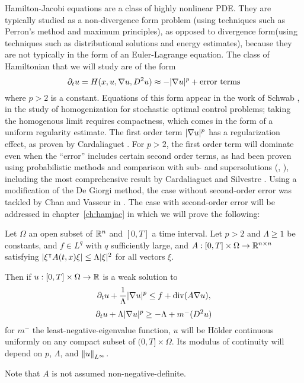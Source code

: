 Hamilton-Jacobi equations are a class of highly nonlinear PDE.  They are typically studied as a non-divergence form problem (using techniques such as Perron's method and maximum principles), as opposed to divergence form(using techniques such as distributional solutions and energy estimates), because they are not typically in the form of an Euler-Lagrange equation.  The class of Hamiltonian that we will study are of the form
\[ \partial_t u = H(x,u,\nabla u, D^2u) \approx -|\nabla u|^p + \textrm{error terms} \]
where $p > 2$ is a constant.  Equations of this form appear in the work of Schwab \cite{Sc}, in the study of homogenization for stochastic optimal control problems; taking the homogenous limit requires compactness, which comes in the form of a uniform regularity estimate.  The first order term $|\nabla u|^p$ has a regularization effect, as proven by Cardaliaguet \cite{Ca}.  %
For $p > 2$, the first order term will dominate even when the ``error'' includes certain second order terms, as had been proven using probabilistic methods and comparison with sub- and supersolutions (\cite{CaCa}, \cite{CaRa}), including the most comprehensive result by Cardaliaguet and Silvestre \cite{CaSi.hamjac}.  Using a modification of the De Giorgi method, the case without second-order error was tackled by Chan and Vasseur in \cite{ChVa}.  The case with second-order error will be addressed in chapter~\ref{ch:hamjac} in which we will prove the following:
\begin{theorem}
Let $\Omega$ an open subset of $\mathbb{R}^n$ and $[0,T]$ a time interval.  Let $p > 2$ and $\Lambda \geq 1$ be constants, and $f \in L^q$ with $q$ sufficiently large, and $A:[0,T]\times \Omega \to \mathbb{R}^{n\times n}$ satisfying $\left\lvert \xi^\intercal A(t,x) \xi \right\rvert \leq \Lambda |\xi|^2$ for all vectors $\xi$.  

Then if $u:[0,T]\times\Omega \to \mathbb{R}$ is a weak solution to
\[ \partial_t u + \frac{1}{\Lambda} |\nabla u|^p \leq f + \operatorname{div}(A \nabla u), \]
\[ \partial_t u + \Lambda |\nabla u|^p \geq -\Lambda + m^-(D^2 u) \]
for $m^-$ the least-negative-eigenvalue function, $u$ will be H\"{o}lder continuous uniformly on any compact subset of $(0,T] \times \Omega$.  Its modulus of continuity will depend on $p$, $\Lambda$, and $\left\lVert u\right\rVert_{L^\infty}$.  
\end{theorem}
Note that $A$ is not assumed non-negative-definite.  


